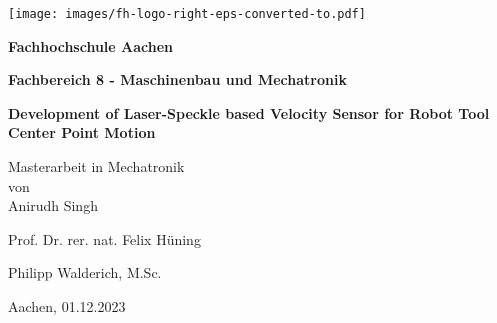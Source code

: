 \newcommand{\titlename}{Development of Laser-Speckle based Velocity Sensor for Robot Tool Center Point Motion}
\newcommand{\authorname}{Anirudh Singh}
\newcommand{\professor}{Prof. Dr. rer. nat. Felix Hüning}
\newcommand{\supervisor}{Philipp Walderich, M.Sc.}
\newcommand{\department}{Fachbereich 8 - Maschinenbau und Mechatronik}
\newcommand{\university}{Fachhochschule Aachen}
\newcommand{\city}{Aachen}

\newcommand{\YEAR}{2023}
\newcommand{\MONTH}{12}
\newcommand{\DAY}{01}
\newcommand{\submissionDate}{\DAY.\MONTH.\YEAR}



\begin{titlepage}
    \begin{center}
        
        \texttt{[image: images/fh-logo-right-eps-converted-to.pdf]}
        
        \vspace{1cm}

        {\Huge\bfseries \university}
        
        \vspace{2cm}

        {\large\bfseries \department}

        \vspace{2cm}

        \begin{spacing}{1.5}
            {\Large\bfseries \titlename}
        \end{spacing}
        
        \vspace{3cm}

        \large{Masterarbeit in Mechatronik} \\
        \vspace{5mm}
        \large{von} \\
        \vspace{5mm}
        {\large \authorname}

        \vspace{2cm}
        
        {\large \professor}
        
        \vspace{1cm}

        {\large \supervisor}

        \vfill

        {\large \city}, {\large \submissionDate}
        
    \end{center}

\end{titlepage}